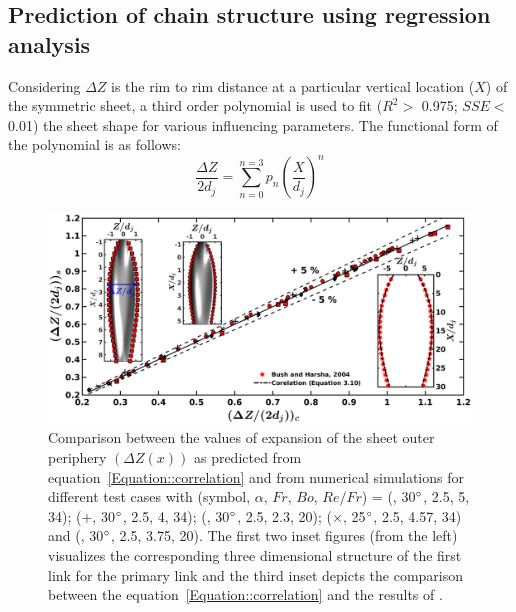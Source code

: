 \subsection{Prediction of chain structure using regression analysis}
Considering $\Delta Z$ is the rim to rim distance at a particular vertical location ($X$) of the symmetric sheet, a third order polynomial is used to fit ($R^2 >$ 0.975; $SSE <$ 0.01) the sheet shape for various influencing parameters. The functional form of the polynomial is as follows: 
\begin{equation}\label{Equation::correlation}
\frac{\Delta Z}{2d_j} = \sum_{n = 0}^{n = 3}p_n\left(\frac{X}{d_j}\right)^n
\end{equation}
\begin{figure}[t]
	\centering
	\includegraphics[width=\linewidth]{chapters/jetJet/Figure9}
	\caption{Comparison between the values of expansion of the sheet outer periphery $\left(\Delta Z(x)\right)$ as predicted from equation~\ref{Equation::correlation} and from numerical simulations for different test cases with (symbol, $\alpha$, $Fr$, $Bo$, $Re/Fr$) = (\protect\MarkerSquareRed, 30$\degree$, 2.5, 5, 34); (+, 30$\degree$, 2.5, 4, 34); (\protect \MarkerDiamondBlack, 30$\degree$, 2.5, 2.3, 20); ($\times$, 25$\degree$, 2.5, 4.57, 34) and (\protect \MarkerCircleRed, 30$\degree$, 2.5, 3.75, 20). The first two inset figures (from the left) visualizes the corresponding three dimensional structure of the first link for the primary link and the third inset depicts the comparison between the equation~\ref{Equation::correlation} and the results of \citet{bush2004collision}.}
	\label{Figure::polyfit}
\end{figure}
